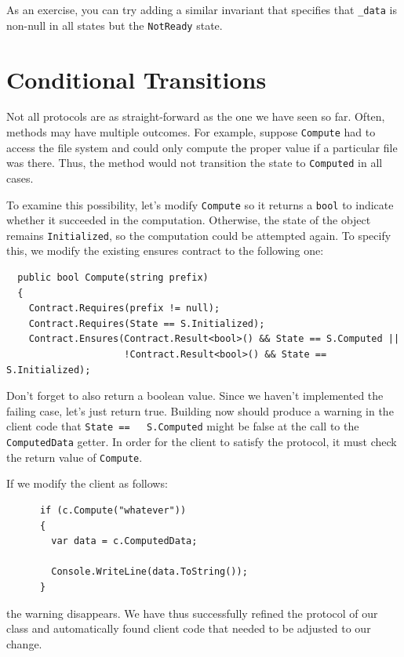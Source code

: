 \documentclass{article}
\newcommand{\code}[1]{\lstinline{#1}}
\begin{document}
As an exercise, you can try adding a similar invariant that specifies
that \code{_data} is non-null in all states but the \code{NotReady}
state.

\section{Conditional Transitions}
Not all protocols are as straight-forward as the one we have seen so
far. Often, methods may have multiple outcomes. For example, suppose
\code{Compute} had to access the file system and could only compute
the proper value if a particular file was there. Thus, the method
would not transition the state to \code{Computed} in all cases.

To examine this possibility,  let's modify \code{Compute} so it
returns a \code{bool} to indicate whether it succeeded in the
computation. Otherwise, the state of the object remains
\code{Initialized}, so the computation could be attempted again.
To specify this, we modify the existing ensures contract to the
following one:
\begin{lstlisting}
  public bool Compute(string prefix)
  {
    Contract.Requires(prefix != null);
    Contract.Requires(State == S.Initialized);
    Contract.Ensures(Contract.Result<bool>() && State == S.Computed ||
                     !Contract.Result<bool>() && State == S.Initialized);
\end{lstlisting}
Don't forget to also return a boolean value. Since we haven't
implemented the failing case, let's just return true. Building now
should produce a warning in the client code that \code{State ==
  S.Computed} might be false at the call to the \code{ComputedData}
getter. In order for the client to satisfy the protocol, it must check
the return value of \code{Compute}.

If we modify the client as follows:
\begin{lstlisting}
      if (c.Compute("whatever"))
      {
        var data = c.ComputedData;

        Console.WriteLine(data.ToString());
      }
\end{lstlisting}
the warning disappears. We have thus successfully refined the protocol
of our class and automatically found client code that needed to be
adjusted to our change.
\end{document}
